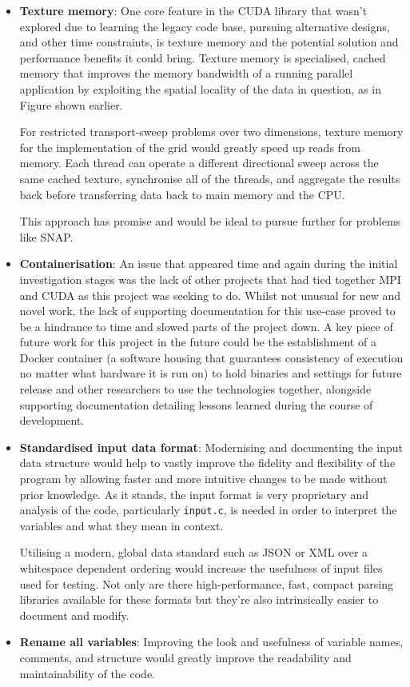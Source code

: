 \documentclass[conference]{IEEEtran}
\begin{document}
\begin{itemize}
    \item \textbf{Texture memory}: One core feature in the CUDA library that wasn't explored due to learning the legacy code base, pursuing alternative designs, and other time constraints, is texture memory and the potential solution and performance benefits it could bring. Texture memory is specialised, cached memory that improves the memory bandwidth of a running parallel application by exploiting the spatial locality of the data in question, as in Figure \label{fig:texmem} shown earlier.        
    
    For restricted transport-sweep problems over two dimensions, texture memory for the implementation of the grid would greatly speed up reads from memory. Each thread can operate a different directional sweep across the same cached texture, synchronise all of the threads, and aggregate the results back before transferring data back to main memory and the CPU. 

    This approach has promise and would be ideal to pursue further for problems like SNAP.

    \item \textbf{Containerisation}: An issue that appeared time and again during the initial investigation stages was the lack of other projects that had tied together MPI and CUDA as this project was seeking to do. Whilst not unusual for new and novel work, the lack of supporting documentation for this use-case proved to be a hindrance to time and slowed parts of the project down. A key piece of future work for this project in the future could be the establishment of a Docker container (a software housing that guarantees consistency of execution no matter what hardware it is run on) to hold binaries and settings for future release and other researchers to use the technologies together, alongside supporting documentation detailing lessons learned during the course of development.

    \item \textbf{Standardised input data format}: Modernising and documenting the input data structure would help to vastly improve the fidelity and flexibility of the program by allowing faster and more intuitive changes to be made without prior knowledge. As it stands, the input format is very proprietary and analysis of the code, particularly \texttt{input.c}, is needed in order to interpret the variables and what they mean in context.
    
    Utilising a modern, global data standard such as JSON or XML over a whitespace dependent ordering would increase the usefulness of input files used for testing. Not only are there high-performance, fast, compact parsing libraries available for these formats but they're also intrinsically easier to document and modify.

    \item \textbf{Rename all variables}: Improving the look and usefulness of variable names, comments, and structure would greatly improve the readability and maintainability of the code.

\end{itemize}




\end{document}
